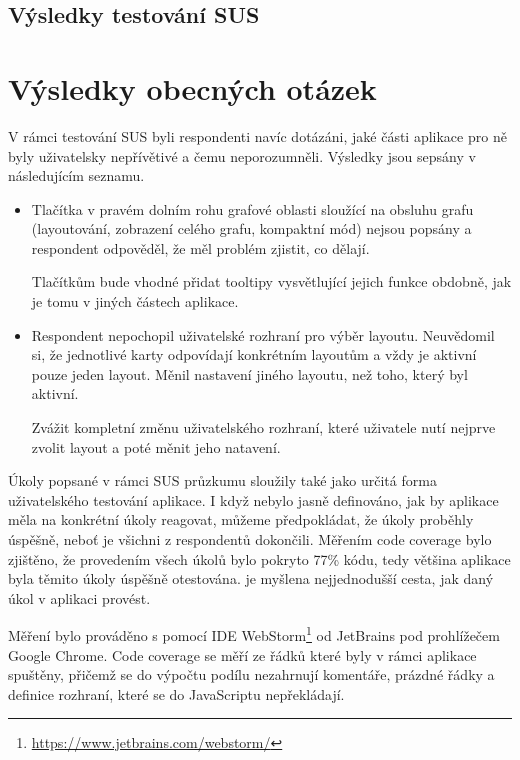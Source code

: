 \subsection{Výsledky testování SUS}


\section{Výsledky obecných otázek}
V rámci testování SUS byli respondenti navíc dotázáni, jaké části aplikace pro ně byly uživatelsky nepřívětivé a čemu neporozumněli. Výsledky jsou sepsány v následujícím seznamu.

\begin{itemize}
    \item Tlačítka v pravém dolním rohu grafové oblasti sloužící na obsluhu grafu (layoutování, zobrazení celého grafu, kompaktní mód) nejsou popsány a respondent odpověděl, že měl problém zjistit, co dělají.

    Tlačítkům bude vhodné přidat tooltipy vysvětlující jejich funkce obdobně, jak je tomu v jiných částech aplikace.
    \item Respondent nepochopil uživatelské rozhraní pro výběr layoutu. Neuvědomil si, že jednotlivé karty odpovídají konkrétním layoutům a vždy je aktivní pouze jeden layout. Měnil nastavení jiného layoutu, než toho, který byl aktivní.

    Zvážit kompletní změnu uživatelského rozhraní, které uživatele nutí nejprve zvolit layout a poté měnit jeho natavení.
\end{itemize}

\bigskip

Úkoly popsané v rámci SUS průzkumu sloužily také jako určitá forma uživatelského testování aplikace. I když nebylo jasně definováno, jak by aplikace měla na konkrétní úkoly reagovat, můžeme předpokládat, že úkoly proběhly úspěšně, neboť je všichni z respondentů dokončili. Měřením code coverage bylo zjištěno, že provedením všech úkolů bylo pokryto 77\% kódu, tedy většina aplikace byla těmito úkoly úspěšně otestována.  je myšlena nejjednodušší cesta, jak daný úkol v aplikaci provést.

Měření bylo prováděno s pomocí IDE WebStorm\footnote{\url{https://www.jetbrains.com/webstorm/}} od JetBrains pod prohlížečem Google Chrome. Code coverage se měří ze řádků které byly v rámci aplikace spuštěny, přičemž se do výpočtu podílu nezahrnují komentáře, prázdné řádky a definice rozhraní, které se do JavaScriptu nepřekládají.